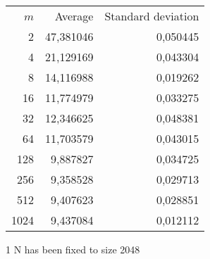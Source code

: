 \begin{tabular}{rrr}\
 $m$ & Average & Standard deviation  \\
2 &  47,381046 &  0,050445 \\ 
4 &  21,129169 &  0,043304 \\ 
8 &  14,116988 &  0,019262 \\ 
16 &  11,774979 &  0,033275 \\ 
32 &  12,346625 &  0,048381 \\ 
64 &  11,703579 &  0,043015 \\ 
128 &  9,887827 &  0,034725 \\ 
256 &  9,358528 &  0,029713 \\ 
512 &  9,407623 &  0,028851 \\ 
1024 &  9,437084 &  0,012112 \\ 
\end{tabular}
\begin{tablenotes}
\item[1] N has been fixed to size 2048
\end{tablenotes}
